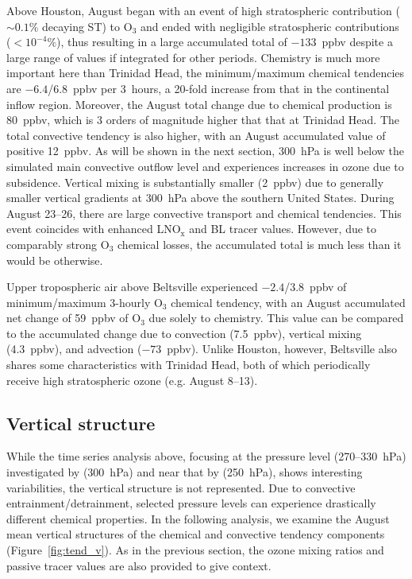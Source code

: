 Above Houston, August began with an event of high stratospheric contribution ($\sim0.1\%$ decaying ST) to O$_3$
and ended with negligible stratospheric contributions ($<10^{-4}\%$), thus resulting in a large accumulated total
of $-133$~ppbv despite a large range of values if integrated for other periods.
Chemistry is much more important here than Trinidad Head, the minimum/maximum chemical tendencies
are $-6.4$/6.8~ppbv per 3~hours, a 20-fold increase from that in the continental inflow region.
Moreover, the August total change due to chemical production is 80~ppbv, which is 3 orders
of magnitude higher that that at Trinidad Head. The total convective tendency is also higher, with an
August accumulated value of positive 12~ppbv.
As will be shown in the next section, 300~hPa is well below the simulated main convective outflow level
and experiences increases in ozone due to subsidence. Vertical mixing is substantially smaller (2~ppbv)
due to generally smaller vertical gradients at 300~hPa above the southern United States. During
August 23--26,  there are large convective transport and chemical tendencies. This event coincides with
enhanced LNO$_{\mathrm{x}}$ and BL tracer values. However, due to comparably strong
O$_3$ chemical losses, the accumulated total is much less than it would be otherwise.

Upper tropospheric air above Beltsville experienced $-2.4$/3.8~ppbv of minimum/maximum 3-hourly O$_3$ chemical
tendency, with an August accumulated net change of 59~ppbv of O$_3$ due solely to chemistry.
This value can be compared to the accumulated change due to convection
(7.5~ppbv), vertical mixing (4.3~ppbv), and advection ($-73$~ppbv). Unlike Houston, however,
Beltsville also shares some characteristics with Trinidad Head, both of which periodically
receive high stratospheric ozone (e.g. August 8--13).

\subsection{Vertical structure}

While the time series analysis above, focusing at the pressure level (270--330~hPa) investigated by \citet{Li:2005ss}
(300~hPa) and near that by \citet{Cooper:2007cr} (250~hPa), shows interesting variabilities,
the vertical structure is not represented. Due to convective entrainment/detrainment, selected
pressure levels can experience drastically different chemical properties. In the following
analysis, we examine the August mean vertical structures of the chemical and convective
tendency components (Figure~\ref{fig:tend_v}). As in the previous section, the ozone
mixing ratios and passive tracer values are also provided to give context.


